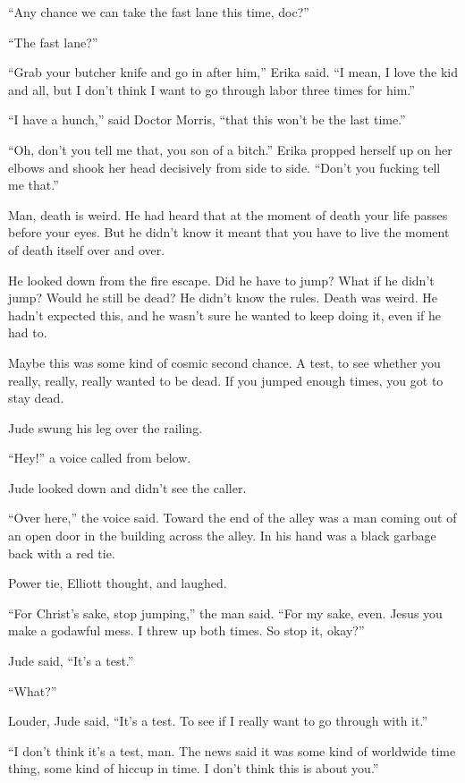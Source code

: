 “Any chance we can take the fast lane this time, doc?”

“The fast lane?”

“Grab your butcher knife and go in after him,” Erika said. “I mean, I love the kid and all, but I don’t think I want to go through labor three times for him.”

“I have a hunch,” said Doctor Morris, “that this won’t be the last time.”

“Oh, don’t you tell me that, you son of a bitch.” Erika propped herself up on her elbows and shook her head decisively from side to side. “Don’t you fucking tell me that.”




 Man, death is weird. He had heard that at the moment of death your life passes before your eyes. But he didn’t know it meant that you have to live the moment of death itself over and over.

He looked down from the fire escape. Did he have to jump? What if he didn’t jump? Would he still be dead? He didn’t know the rules. Death was weird. He hadn’t expected this, and he wasn’t sure he wanted to keep doing it, even if he had to.

Maybe this was some kind of cosmic second chance. A test, to see whether you really, really, really wanted to be dead. If you jumped enough times, you got to stay dead.

Jude swung his leg over the railing.

“Hey!” a voice called from below.

Jude looked down and didn’t see the caller.

“Over here,” the voice said. Toward the end of the alley was a man coming out of an open door in the building across the alley. In his hand was a black garbage back with a red tie.

Power tie, Elliott thought, and laughed.

“For Christ’s sake, stop jumping,” the man said. “For my sake, even. Jesus you make a godawful mess. I threw up both times. So stop it, okay?”

Jude said, “It’s a test.”

“What?”

Louder, Jude said, “It’s a test. To see if I really want to go through with it.”

“I don’t think it’s a test, man. The news said it was some kind of worldwide time thing, some kind of hiccup in time. I don’t think this is about you.”

